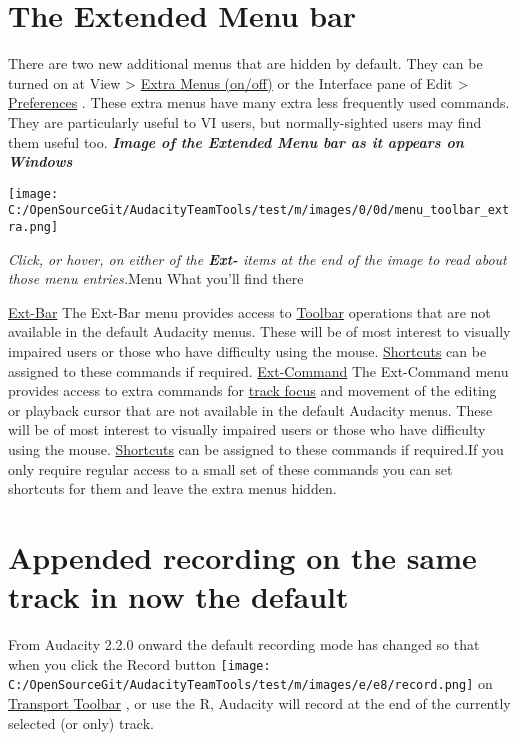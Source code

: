 \begin{multicols}{2}
\section{The Extended Menu bar}There are two new additional menus that are hidden by default.  They can be turned on at View > 
\hyperref[XXX\foo{view_menu__extra_menus_onoff}]{Extra Menus (on/off)}
 or the Interface pane of Edit > 
\hyperref[XXX\foo{interface_preferences_}]{Preferences}
.
These extra menus have many extra less frequently used commands.  They are particularly useful to VI users, but normally-sighted users may find them useful too.
\textit{\textbf{Image of the Extended Menu bar as it appears on Windows}}\par \texttt{[image: C:/OpenSourceGit/AudacityTeamTools/test/m/images/0/0d/menu\_toolbar\_extra.png]}\par \textit{Click, or hover, on either of the \textbf{Ext-} items at the end of the image to read about those menu entries.}Menu
What you'll find there

\hyperref[XXX\foo{ext_bar_menu_}]{Ext-Bar}
The Ext-Bar menu provides access to 
\hyperref[XXX\foo{toolbars_overview_}]{Toolbar}
 operations that are not available in the default Audacity menus. These will be of most interest to visually impaired users or those who have difficulty using the mouse.
\hyperref[XXX\foo{keyboard_preferences_}]{Shortcuts}
 can be assigned to these commands if required.
\hyperref[XXX\foo{ext_command_menu_}]{Ext-Command}
The Ext-Command menu provides access to extra commands for 
\hyperref[XXX\foo{audio_tracks__focus}]{track focus}
 and movement of the editing or playback cursor that are not available in the default Audacity menus. These will be of most interest to visually impaired users or those who have difficulty using the mouse.
\hyperref[XXX\foo{keyboard_preferences_}]{Shortcuts}
 can be assigned to these commands if required.If you only require regular access to a small set of these commands you can set shortcuts for them and leave the extra menus hidden.
\section{Appended recording on the same track in now the default}From Audacity 2.2.0 onward the default recording mode has changed so that when you click the Record button \texttt{[image: C:/OpenSourceGit/AudacityTeamTools/test/m/images/e/e8/record.png]} on 
\hyperref[XXX\foo{transport_toolbar_}]{Transport Toolbar}
, or use the R, Audacity will record at the end of the currently selected (or only) track.


\end{multicols}
